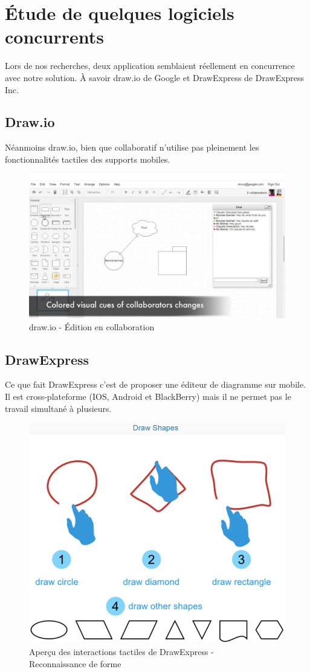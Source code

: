 \documentclass[a4paper,11pt]{article}
\begin{document}
\newpage
\section{Étude de quelques logiciels concurrents}
Lors de nos recherches, deux application semblaient réellement en concurrence avec notre solution. À savoir draw.io de Google et DrawExpress de DrawExpress Inc.



\subsection{Draw.io}
Néanmoins draw.io, bien que collaboratif n'utilise pas pleinement les fonctionnalités tactiles des supports mobiles.

\begin{figure}[h]
	\centering
	\includegraphics[width=\textwidth]{img/drawio}
	\caption{draw.io - Édition en collaboration}
\end{figure}




\subsection{DrawExpress}
Ce que fait DrawExpress c'est de proposer une éditeur de diagramme sur mobile. Il est cross-plateforme (IOS, Android et BlackBerry) mais il ne permet pas le travail simultané à plusieurs.

\begin{figure}[!h]
	\centering
	\includegraphics[width=.6\textwidth]{img/DrawExpressRecognition}
	\caption{Aperçu des interactions tactiles de DrawExpress - \\Reconnaissance de forme}
\end{figure}
\end{document}
